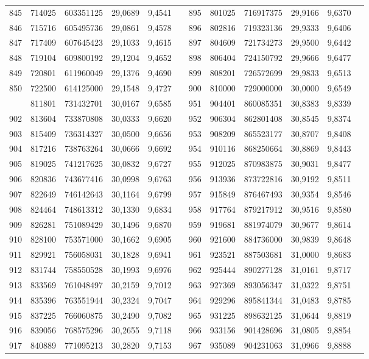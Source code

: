 \begin{longtable}{p{.17\linewidth}*{11}{S}}
845&714025&603351125&29,0689&9,4541&&895&801025&716917375&29,9166&9,6370\\
846&715716&605495736&29,0861&9,4578&&896&802816&719323136&29,9333&9,6406\\
847&717409&607645423&29,1033&9,4615&&897&804609&721734273&29,9500&9,6442\\
848&719104&609800192&29,1204&9,4652&&898&806404&724150792&29,9666&9,6477\\
849&720801&611960049&29,1376&9,4690&&899&808201&726572699&29,9833&9,6513\\
850&722500&614125000&29,1548&9,4727&&900&810000&729000000&30,0000&9,6549\\
&811801&731432701&30,0167&9,6585&&951&904401&860085351&30,8383&9,8339\\
902&813604&733870808&30,0333&9,6620&&952&906304&862801408&30,8545&9,8374\\
903&815409&736314327&30,0500&9,6656&&953&908209&865523177&30,8707&9,8408\\
904&817216&738763264&30,0666&9,6692&&954&910116&868250664&30,8869&9,8443\\
905&819025&741217625&30,0832&9,6727&&955&912025&870983875&30,9031&9,8477\\
906&820836&743677416&30,0998&9,6763&&956&913936&873722816&30,9192&9,8511\\
907&822649&746142643&30,1164&9,6799&&957&915849&876467493&30,9354&9,8546\\
908&824464&748613312&30,1330&9,6834&&958&917764&879217912&30,9516&9,8580\\
909&826281&751089429&30,1496&9,6870&&959&919681&881974079&30,9677&9,8614\\
910&828100&753571000&30,1662&9,6905&&960&921600&884736000&30,9839&9,8648\\
911&829921&756058031&30,1828&9,6941&&961&923521&887503681&31,0000&9,8683\\
912&831744&758550528&30,1993&9,6976&&962&925444&890277128&31,0161&9,8717\\
913&833569&761048497&30,2159&9,7012&&963&927369&893056347&31,0322&9,8751\\
914&835396&763551944&30,2324&9,7047&&964&929296&895841344&31,0483&9,8785\\
915&837225&766060875&30,2490&9,7082&&965&931225&898632125&31,0644&9,8819\\
916&839056&768575296&30,2655&9,7118&&966&933156&901428696&31,0805&9,8854\\
917&840889&771095213&30,2820&9,7153&&967&935089&904231063&31,0966&9,8888\\

\end{longtable}
